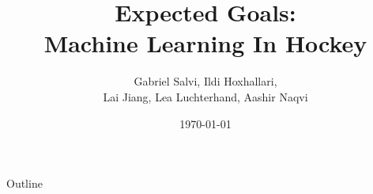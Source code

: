\documentclass[dvipsnames]{beamer}
\title{Expected Goals: \\Machine Learning In Hockey}
\author{ Gabriel Salvi, Ildi Hoxhallari,\\ Lai Jiang, Lea Luchterhand, Aashir Naqvi}
\institute[]{Department of Mathematics, Northeastern University}
\date{\today}
\begin{document}
\begin{frame}
    \titlepage
\end{frame}

\begin{frame}{Outline}
    \tableofcontents
\end{frame}




\end{document}
